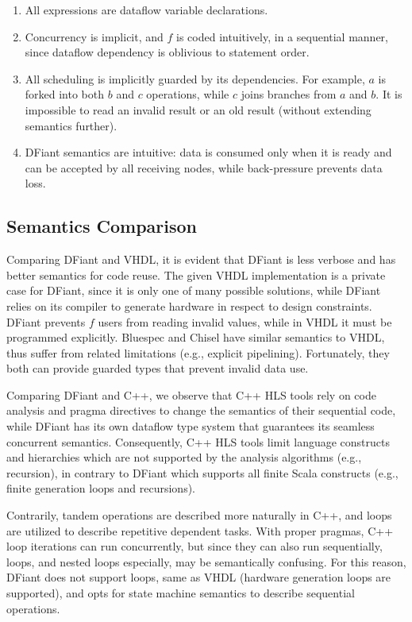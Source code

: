 \begin{enumerate}
	\item All expressions are dataflow variable declarations.
	\item Concurrency is implicit, and $f$ is coded intuitively, in a sequential manner, since dataflow dependency is oblivious to statement order. 
	\item All scheduling is implicitly guarded by its dependencies. For example, $a$ is forked into both $b$ and $c$ operations, while $c$ joins branches from $a$ and $b$.
	It is impossible to read an invalid result or an old result (without extending semantics further).
	\item DFiant semantics are intuitive: data is consumed only when it is ready and can be accepted by all receiving nodes, while back-pressure prevents data loss. 
\end{enumerate} 


\subsection{Semantics Comparison}
Comparing DFiant and VHDL, it is evident that DFiant is less verbose and has better semantics for code reuse. The given VHDL implementation is a private case for DFiant, since it is only one of many possible solutions, while DFiant relies on its compiler to generate hardware in respect to design constraints. DFiant prevents $f$ users from reading invalid values, while in VHDL it must be programmed explicitly. Bluespec and Chisel have similar semantics to VHDL, thus suffer from related limitations (e.g., explicit pipelining). Fortunately, they both can provide guarded types that prevent invalid data use.

Comparing DFiant and C++, we observe that C++ HLS tools rely on code analysis and pragma directives to change the semantics of their sequential code, while DFiant has its own dataflow type system that guarantees its seamless concurrent semantics. Consequently, C++ HLS tools limit language constructs and hierarchies which are not supported by the analysis algorithms (e.g., recursion), in contrary to DFiant which supports all finite Scala constructs (e.g., finite generation loops and recursions). 

Contrarily, tandem operations are described more naturally in C++, and loops are utilized to describe repetitive dependent tasks. With proper pragmas, C++ loop iterations can run concurrently, but since they can also run sequentially, loops, and nested loops especially, may be semantically confusing. For this reason, DFiant does not support loops, same as VHDL (hardware generation loops are supported), and opts for state machine semantics to describe sequential operations. %

